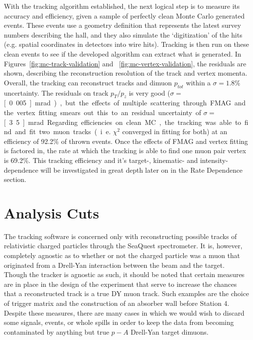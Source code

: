 With the tracking algorithm established, the next logical step is to measure its accuracy and efficiency, given a sample of perfectly clean Monte Carlo generated events. These events use a geometry definition that represents the latest survey numbers describing the hall, and they also simulate the `digitization' of the hits (e.g. spatial coordinates in detectors into wire hits). Tracking is then run on these clean events to see if the developed algorithm can extract what is generated. In Figures~\ref{fig:mc-track-validation} and ~\ref{fig:mc-vertex-validation}, the residuals are shown, describing the reconstruction resolution of the track and vertex momenta. Overall, the tracking can reconstruct tracks and dimuon $p_{tot}$ within a $\sigma=1.8\%$ uncertainty. The residuals on track $p_T/p_z$ is very good ($\sigma=$\unit[0.005]{mrad}), but the effects of multiple scattering through FMAG and the vertex fitting smears out this to an residual uncertainty of $\sigma=$\unit[3.5]{mrad}.

Regarding efficiencies on clean MC, the tracking was able to find and fit two muon tracks (i.e. $\chi^2$ converged in fitting for both) at an efficiency of 92.2\% of thrown events. Once the effects of FMAG and vertex fitting is factored in, the rate at which the tracking is able to find one muon pair vertex is 69.2\%. This tracking efficiency and it's target-, kinematic- and intensity-dependence will be investigated in great depth later on in the Rate Dependence section.

\section{Analysis Cuts}\label{sec:data-cuts}

The tracking software is concerned only with reconstructing possible tracks of relativistic charged particles through the SeaQuest spectrometer. It is, however, completely agnostic as to whether or not the charged particle was a muon that originated from a Drell-Yan interaction between the beam and the target. Though the tracker is agnostic as such, it should be noted that certain measures are in place in the design of the experiment that serve to increase the chances that a reconstructed track is a true DY muon track. Such examples are the choice of trigger matrix and the construction of an absorber wall before Station 4. Despite these measures, there are many cases in which we would wish to discard some signals, events, or whole spills in order to keep the data from becoming contaminated by anything but true $p-A$ Drell-Yan target dimuons.

